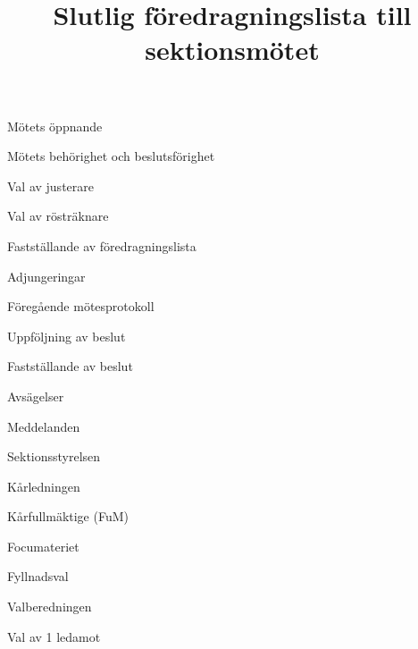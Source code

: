 \documentclass{../sektionsmote} %
\title{Slutlig föredragningslista till sektionsmötet}
\begin{document}
\maketitle

\begin{ootd}

\item{Mötets öppnande}

\item{Mötets behörighet och beslutsförighet}

\item{Val av justerare}

\item{Val av rösträknare}

\item{Fastställande av föredragningslista}

\item{Adjungeringar}

\item{Föregående mötesprotokoll}

\item{Uppföljning av beslut}

\item{Fastställande av beslut}
\begin{ootd}
    \item Avsägelser
\end{ootd}

\item{Meddelanden}
\begin{ootd}
    \item Sektionsstyrelsen
    \item Kårledningen
    \item Kårfullmäktige (FuM)
    \item Focumateriet
\end{ootd}

\item{Fyllnadsval}
\begin{ootd}
    \item Valberedningen
    \begin{ootd}
        \item Val av 1 ledamot
    \end{ootd}
\end{ootd}


\end{ootd}
\end{document}
